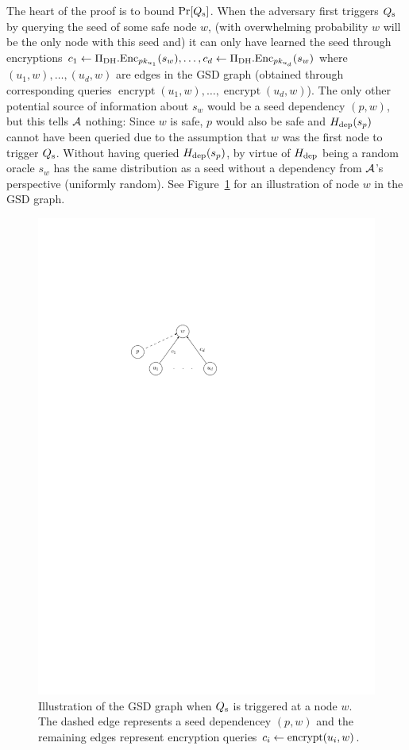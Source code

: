 The heart of the proof is to bound $\pr{\qs}$. When the adversary first triggers $Q_\mathrm{s}$ by querying the seed of some safe node $w$, (with overwhelming probability $w$ will be the only node with this seed and) it can only have learned the seed through encryptions
$c_1 \leftarrow \Pi_{\mathrm{DH}}.\mathrm{Enc}_{pk_{u_1}}(s_w), \ldots, c_d \leftarrow \Pi_{\mathrm{DH}}.\mathrm{Enc}_{pk_{u_d}}(s_w)$
where $(u_1, w), \ldots, (u_d, w)$ are edges in the GSD graph (obtained through corresponding queries $\operatorname{encrypt}(u_1, w), \ldots, \operatorname{encrypt}(u_d, w)$). The only other potential source of information about $s_w$ would be a seed dependency $(p, w)$, but this tells $\mathcal{A}$ nothing: Since $w$ is safe, $p$ would also be safe and $H_\mathrm{dep}(s_p)$ cannot have been queried due to the assumption that $w$ was the first node to trigger $Q_\mathrm{s}$.
Without having queried $H_\mathrm{dep}(s_p)$, by virtue of $H_\mathrm{dep}$ being a random oracle $s_w$ has the same distribution as a seed without a dependency from $\mathcal{A}$'s perspective (uniformly random). See Figure~\ref{fig:gsd-qs-triggered} for an illustration of node $w$ in the GSD graph.

\begin{figure}
	\begin{center}
		\includegraphics{figures/gsd-qs-triggered}
	\end{center}
	\caption{Illustration of the GSD graph when $Q_\mathrm{s}$ is triggered at a node $w$. The dashed edge represents a seed dependencey $(p, w)$ and the remaining edges represent encryption queries $c_i \leftarrow \operatorname{encrypt}(u_i, w)$.}
	\label{fig:gsd-qs-triggered}
\end{figure}

